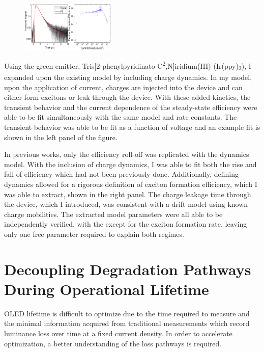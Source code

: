 \documentclass[a4paper,titlepage]{article}
\begin{document}
\begin{figure}
\vspace{-15pt}
\includegraphics[width=0.4\textwidth]{unified}
\vspace{-20pt}
\end{figure}

Using the green emitter, Tris[2-phenylpyridinato-C\textsuperscript{2},N]iridium(III) (Ir(ppy)\textsubscript{3}), I expanded upon the existing model by including charge dynamics.  In my model, upon the application of current, charges are injected into the device and can either form excitons or leak through the device.  With these added kinetics, the transient behavior and the current dependence of the steady-state efficiency were able to be fit simultaneously with the same model and rate constants.  The transient behavior was able to be fit as a function of voltage and an example fit is shown in the left panel of the figure.  

In previous works, only the efficiency roll-off was replicated with the dynamics model.  With the inclusion of charge dynamics, I was able to fit both the rise and fall of efficiency which had not been previously done.  Additionally, defining dynamics allowed for a rigorous definition of exciton formation efficiency, which I was able to extract, shown in the right panel.  The charge leakage time through the device, which I introduced, was consistent with a drift model using known charge mobilities.  The extracted model parameters were all able to be independently verified, with the except for the exciton formation rate, leaving only one free parameter required to explain both regimes.

\section*{Decoupling Degradation Pathways During Operational Lifetime}

OLED lifetime is difficult to optimize due to the time required to measure and the minimal information acquired from traditional measurements which record luminance loss over time at a fixed current density.  In order to accelerate optimization, a better understanding of the loss pathways is required.  
\end{document}
